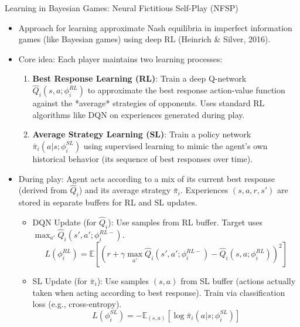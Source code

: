 \documentclass[10pt]{beamer}
\newcommand{\E}{\mathbb{E}}
\begin{document}

\begin{frame}{Learning in Bayesian Games: Neural Fictitious Self-Play (NFSP)}
    \begin{itemize}
        \item Approach for learning approximate Nash equilibria in imperfect information games (like Bayesian games) using deep RL (Heinrich \& Silver, 2016).
        \item Core idea: Each player maintains two learning processes:
        \begin{enumerate}
            \item \textbf{Best Response Learning (RL)}: Train a deep Q-network $\hat{Q}_i(s,a;\phi^{RL}_i)$ to approximate the best response action-value function against the *average* strategies of opponents. Uses standard RL algorithms like DQN on experiences generated during play.
            \item \textbf{Average Strategy Learning (SL)}: Train a policy network $\bar{\pi}_i(a|s;\phi^{SL}_i)$ using supervised learning to mimic the agent's own historical behavior (its sequence of best responses over time).
        \end{enumerate}
        \vspace{0.2cm}
        \item During play: Agent acts according to a mix of its current best response (derived from $\hat{Q}_i$) and its average strategy $\bar{\pi}_i$. Experiences $(s, a, r, s')$ are stored in separate buffers for RL and SL updates.
         \begin{itemize}
             \item DQN Update (for $\hat{Q}_i$): Use samples from RL buffer. Target uses $\max_{a'} \hat{Q}_i(s',a'; \phi^{RL-}_i)$.
              \begin{equation*}
                L(\phi^{RL}_i) = \E \left[ \left( r + \gamma \max_{a'} \hat{Q}_i(s',a';\phi^{RL-}_i) - \hat{Q}_i(s,a;\phi^{RL}_i) \right)^2 \right]
              \end{equation*}
             \item SL Update (for $\bar{\pi}_i$): Use samples $(s,a)$ from SL buffer (actions actually taken when acting according to best response). Train via classification loss (e.g., cross-entropy).
              \begin{equation*}
                  L(\phi^{SL}_i) = -\E_{(s,a)} \left[ \log \bar{\pi}_i(a|s;\phi^{SL}_i) \right]

\end{equation*}
\end{itemize}
\end{itemize}
\end{frame}
\end{document}
